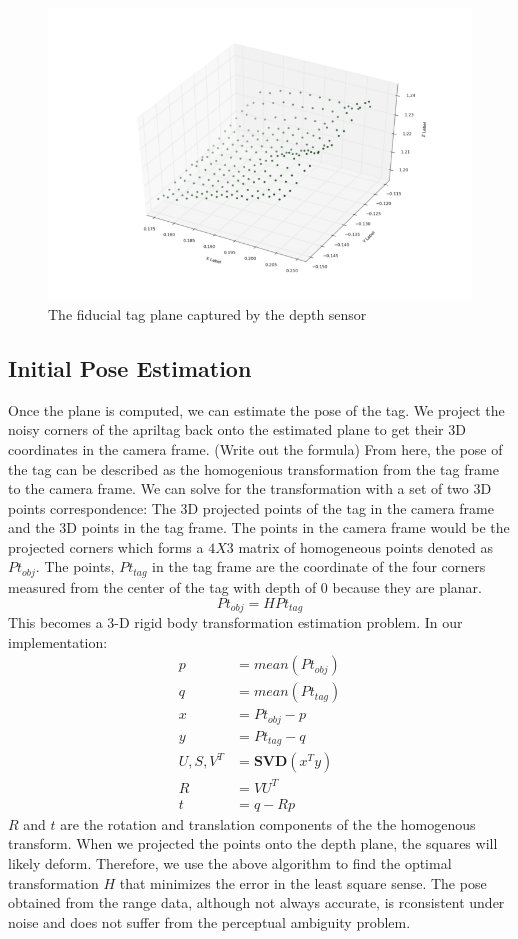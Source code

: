 \begin{figure}
\centering
\includegraphics[width=\columnwidth]{figs/depth_plane_fig}
\caption{The fiducial tag plane captured by the depth sensor}
\label{fig:calib}
\end{figure}

\subsection{Initial Pose Estimation}
Once the plane is computed, we can estimate the pose of the tag. We project the noisy corners of the apriltag back onto the estimated plane to get their 3D coordinates in the camera frame. (Write out the formula) From here, the pose of the tag can be described as the homogenious transformation from the tag frame to the camera frame. We can solve for the transformation with a set of two 3D points correspondence: The 3D projected points of the tag in the camera frame and the 3D points in the tag frame. The points in the camera frame would be the projected corners which forms a $4X3$ matrix of homogeneous points denoted as $Pt_{obj}$. The points, $Pt_{tag}$ in the tag frame are the coordinate of the four corners measured from the center of the tag with depth of 0 because they are planar. 
$$Pt_{obj} = H Pt_{tag}$$
This becomes a 3-D rigid body transformation estimation problem. In our implementation:
\begin{align*}
p &= mean(Pt_{obj})\\
q &= mean(Pt_{tag})\\
x &=Pt_{obj} - p\\
y &=Pt_{tag} - q\\
U, S, V^T &= \textbf{SVD}(x^T y)\\
R &= VU^T \\
t &= q-Rp 
\end{align*}
$R$ and $t$ are the rotation and translation components of the the homogenous transform. When we projected the points onto the depth plane, the squares will likely deform. Therefore, we use the above algorithm to find the optimal transformation $H$ that minimizes the error in the least square sense. 
The pose obtained from the range data, although not always accurate, is rconsistent under noise and does not suffer from the perceptual ambiguity problem. 
